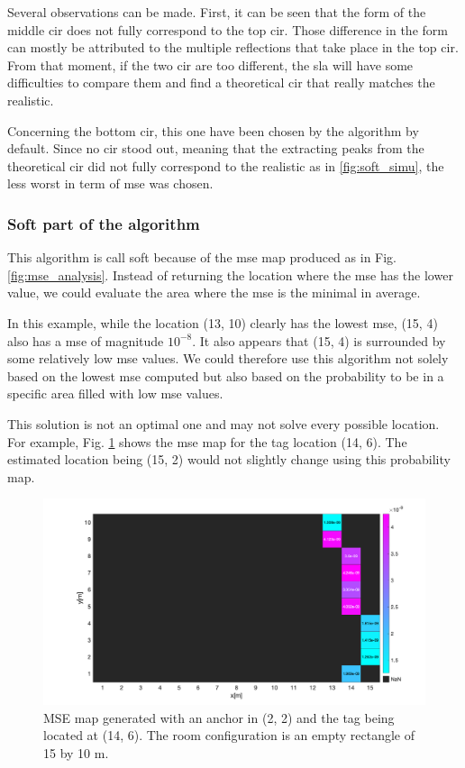 Several observations can be made. First, it can be seen that the form of the middle \gls{cir} does not fully correspond to the top \gls{cir}. Those difference in the form can mostly be attributed to the multiple reflections that take place in the top \gls{cir}. From that moment, if the two \gls{cir} are too different, the \gls{sla} will have some difficulties to compare them and find a theoretical \gls{cir} that really matches the realistic.
\vspace{2mm}

Concerning the bottom \gls{cir}, this one have been chosen by the algorithm by default. Since no \gls{cir} stood out, meaning that the extracting peaks from the theoretical \gls{cir} did not fully correspond to the realistic as in \ref{fig:soft_simu}, the less worst in term of \gls{mse} was chosen.
\vspace{2mm}

\subsubsection{Soft part of the algorithm}

This algorithm is call soft because of the \gls{mse} map produced as in Fig. \ref{fig:mse_analysis}. Instead of returning the location where the \gls{mse} has the lower value, we could evaluate the area where the \gls{mse} is the minimal in average.
\vspace{2mm}

In this example, while the location (13, 10) clearly has the lowest \gls{mse}, (15, 4) also has a \gls{mse} of magnitude $10^{-8}$. It also appears that (15, 4) is surrounded by some relatively low \gls{mse} values. We could therefore use this algorithm not solely based on the lowest \gls{mse} computed but also based on the probability to be in a specific area filled with low \gls{mse} values.
\vspace{2mm}

This solution is not an optimal one and may not solve every possible location. For example, Fig. \ref{fig:again_an_image} shows the \gls{mse} map for the tag location (14, 6). The estimated location being (15, 2) would not slightly change using this probability map.

\begin{figure}[H]
\centering
\includegraphics[width=.9\linewidth]{Images/image_XXX.png}
\caption{MSE map generated with an anchor in (2, 2) and the tag being located at (14, 6). The room configuration is an empty rectangle of 15 by 10 m. \label{fig:again_an_image}}
\end{figure}


